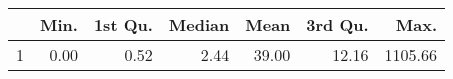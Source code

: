 \begin{table}[ht]
\centering
\begin{tabular}{rrrrrrr}
  \hline
 & Min. & 1st Qu. & Median & Mean & 3rd Qu. & Max. \\ 
  \hline
1 & 0.00 & 0.52 & 2.44 & 39.00 & 12.16 & 1105.66 \\ 
   \hline
\end{tabular}
\end{table}
